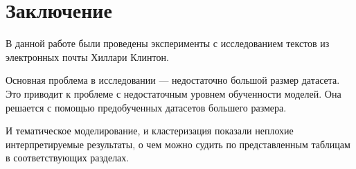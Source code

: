 \chapter*{Заключение}

В данной работе были проведены эксперименты с исследованием текстов из электронных почты Хиллари Клинтон. 

Основная проблема в исследовании --- недостаточно большой размер датасета. Это приводит к проблеме с недостаточным уровнем обученности моделей. Она решается с помощью предобученных датасетов большего размера. 

И тематическое моделирование, и кластеризация показали неплохие интерпретируемые результаты, о чем можно судить по представленным таблицам в соответствующих разделах.

\clearpage